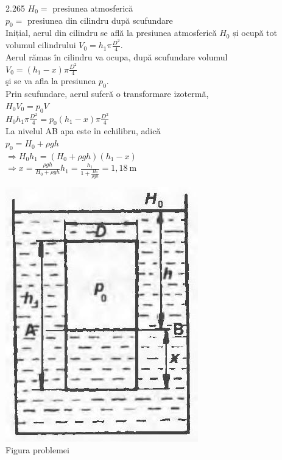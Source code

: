 2.265 $H_{0}=$ presiunea atmosferică\\ $p_{0}=$ presiunea din cilindru după scufundare\\ Inițial, aerul din cilindru se află la presiunea atmosferică $H_{0}$ și ocupă tot\\ volumul cilindrului $V_{0}=h_{1} \pi \frac{D^{2}}{4}$.\\ Aerul rămas în cilindru va ocupa, după scufundare volumul\\ $V_{0}=\left(h_{1}-x\right) \pi \frac{D^{2}}{4}$\\ şi se va afla la presiunea $p_{0}$.\\ Prin scufundare, aerul suferă o transformare izotermă,\\ $H_{0} V_{0}=p_{0} V$\\ $H_{0} h_{1} \pi \frac{D^{2}}{4}=p_{0}\left(h_{1}-x\right) \pi \frac{D^{2}}{4}$\\ La nivelul AB apa este în echilibru, adică\\ $p_{0}=H_{0}+\rho g h$\\ $\Rightarrow H_{0} h_{1}=\left(H_{0}+\rho g h\right)\left(h_{1}-x\right)$\\ $\Rightarrow x=\frac{\rho g h}{H_{0}+\rho g h} h_{1}=\frac{h_{1}}{1+\frac{H_{0}}{\rho g h}}=1,18 \mathrm{~m}$\\ \begin{center} \includegraphics[width=0.4\linewidth]{images/2025_07_01_5b3ff9fa0d508c8e9f17g-328}\\ Figura problemei \end{center}\\


